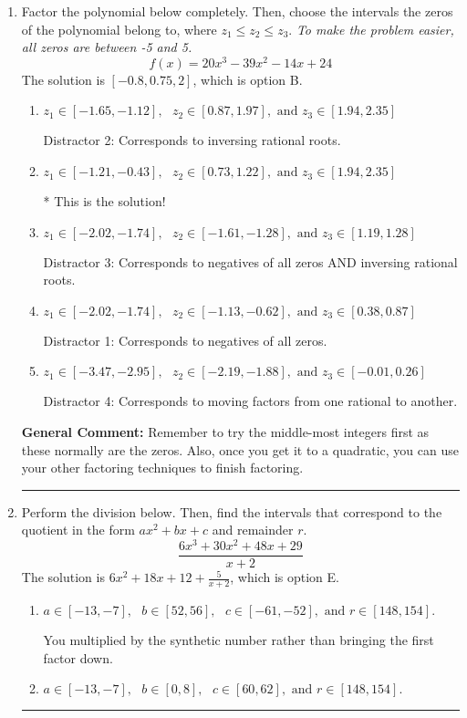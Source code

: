 \documentclass{extbook}[14pt]
\newcommand{\litem}[1]{\item #1

\rule{\textwidth}{0.4pt}}
\begin{document}
\begin{enumerate}\litem{
Factor the polynomial below completely. Then, choose the intervals the zeros of the polynomial belong to, where $z_1 \leq z_2 \leq z_3$. \textit{To make the problem easier, all zeros are between -5 and 5.}
\[ f(x) = 20x^{3} -39 x^{2} -14 x + 24 \]The solution is \( [-0.8, 0.75, 2] \), which is option B.\begin{enumerate}[label=\Alph*.]
\item \( z_1 \in [-1.65, -1.12], \text{   }  z_2 \in [0.87, 1.97], \text{   and   } z_3 \in [1.94, 2.35] \)

 Distractor 2: Corresponds to inversing rational roots.
\item \( z_1 \in [-1.21, -0.43], \text{   }  z_2 \in [0.73, 1.22], \text{   and   } z_3 \in [1.94, 2.35] \)

* This is the solution!
\item \( z_1 \in [-2.02, -1.74], \text{   }  z_2 \in [-1.61, -1.28], \text{   and   } z_3 \in [1.19, 1.28] \)

 Distractor 3: Corresponds to negatives of all zeros AND inversing rational roots.
\item \( z_1 \in [-2.02, -1.74], \text{   }  z_2 \in [-1.13, -0.62], \text{   and   } z_3 \in [0.38, 0.87] \)

 Distractor 1: Corresponds to negatives of all zeros.
\item \( z_1 \in [-3.47, -2.95], \text{   }  z_2 \in [-2.19, -1.88], \text{   and   } z_3 \in [-0.01, 0.26] \)

 Distractor 4: Corresponds to moving factors from one rational to another.
\end{enumerate}

\textbf{General Comment:} Remember to try the middle-most integers first as these normally are the zeros. Also, once you get it to a quadratic, you can use your other factoring techniques to finish factoring.
}
\litem{
Perform the division below. Then, find the intervals that correspond to the quotient in the form $ax^2+bx+c$ and remainder $r$.
\[ \frac{6x^{3} +30 x^{2} +48 x + 29}{x + 2} \]The solution is \( 6x^{2} +18 x + 12 + \frac{5}{x + 2} \), which is option E.\begin{enumerate}[label=\Alph*.]
\item \( a \in [-13, -7], \text{   } b \in [52, 56], \text{   } c \in [-61, -52], \text{   and   } r \in [148, 154]. \)

 You multiplied by the synthetic number rather than bringing the first factor down.
\item \( a \in [-13, -7], \text{   } b \in [0, 8], \text{   } c \in [60, 62], \text{   and   } r \in [148, 154]. \)


\end{enumerate}}
\end{enumerate}
\end{document}
